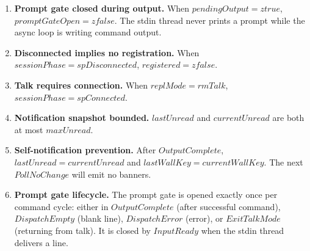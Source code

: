 \documentclass[a4paper,10pt,fleqn]{article}
\begin{document}
\begin{enumerate}
\item \textbf{Prompt gate closed during output.}  When
  $pendingOutput = ztrue$, $promptGateOpen = zfalse$.  The stdin
  thread never prints a prompt while the async loop is writing
  command output.

\item \textbf{Disconnected implies no registration.}  When
  $sessionPhase = spDisconnected$, $registered = zfalse$.

\item \textbf{Talk requires connection.}  When $replMode = rmTalk$,
  $sessionPhase = spConnected$.

\item \textbf{Notification snapshot bounded.}  $lastUnread$ and
  $currentUnread$ are both at most $maxUnread$.

\item \textbf{Self-notification prevention.}  After
  $OutputComplete$, $lastUnread = currentUnread$ and
  $lastWallKey = currentWallKey$.  The next $PollNoChange$ will
  emit no banners.

\item \textbf{Prompt gate lifecycle.}  The prompt gate is opened
  exactly once per command cycle: either in $OutputComplete$ (after
  successful command), $DispatchEmpty$ (blank line), $DispatchError$
  (error), or $ExitTalkMode$ (returning from talk).  It is closed
  by $InputReady$ when the stdin thread delivers a line.
\end{enumerate}
\end{document}
